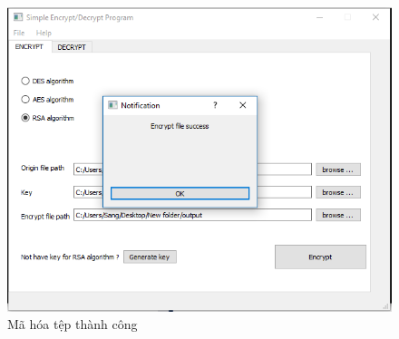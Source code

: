 \documentclass[a4paper]{article}
\begin{document}
\begin{itemize}
\begin{center}
\begin{figure}[H]
\begin{center}
     \includegraphics[scale=.5]{hinh/rsa-2}
    \end{center}
    \caption{Mã hóa tệp thành công}
    \label{refhinh7}
    \end{figure}
	\end{center}
\end{itemize}
\end{document}
